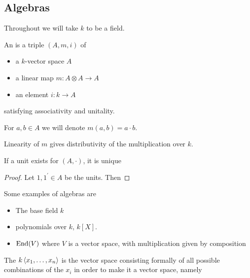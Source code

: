 \documentclass{article}
\begin{document}
\subsection{Algebras}
Throughout we will take $k$ to be a field. 

\begin{definition}
	An  is a triple $(A,m,i)$ of
	\begin{itemize}
		\item a $k$-vector space $A$
		\item a linear map $m: A \otimes A \to A$
		\item an element $i : k \to A$
	\end{itemize}
	satisfying associativity and unitality. 
\end{definition}

\begin{notation}
	For $a,b \in A$ we will denote $m(a,b) = a \cdot b$. 
\end{notation}

\begin{remark}
	Linearity of $m$ gives distributivity of the multiplication over $k$.
\end{remark}

\begin{prop}
	If a unit exists for $(A,\cdot)$, it is unique
\end{prop}
\begin{proof}
	Let $1,1^\prime\in A$ be the units. Then 
\end{proof}


\begin{example}
	Some examples of algebras are 
	\begin{itemize}
		\item The base field $k$
		\item polynomials over $k$, $k[X]$. 
		\item $\operatorname{End}(V)$ where $V$ is a vector space, with multiplication given by composition
	\end{itemize}
\end{example}

\begin{example}
	The  $k\left\langle x_1, \dots, x_n \right\rangle$ is the vector space consisting formally of all possible combinations of the $x_i$ in order to make it a vector space, namely 
\end{example}
\end{document}

